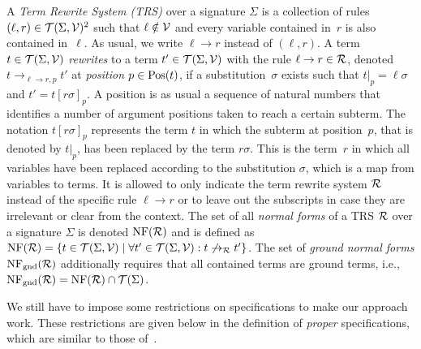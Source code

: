 \documentclass{eptcs}
\begin{document}
A \emph{Term Rewrite System (TRS)} over a signature $\Sigma$ is a collection of
rules $(\ell,r) \in \mathcal{T}(\Sigma,\mathcal{V})^2$ such that $\ell \notin \mathcal{V}$ and every
variable contained in~$r$ is also contained in~$\ell$. As usual, we write
$\ell \to r$ instead of $(\ell,r)$.
A term $t \in \mathcal{T}(\Sigma,\mathcal{V})$ \emph{rewrites} to a term $t' \in \mathcal{T}(\Sigma,\mathcal{V})$
with the rule $\ell \to r \in \mathcal{R}$, denoted $t \to_{\ell \to r,p} t'$
at \emph{position} $p \in \mathrm{Pos}(t)$, if a substitution~$\sigma$
exists such that $t|_p = \ell\sigma$ and $t' = t[r\sigma]_p$.
A position is as usual a sequence of natural numbers that identifies a number of
argument positions taken to reach a certain subterm. The notation $t[r\sigma]_p$
represents the term $t$ in which the subterm at position~$p$, that is denoted
by $t|_p$, has been replaced by the term $r\sigma$. This is the term~$r$ in
which all variables have been replaced according to the substitution $\sigma$,
which is a map from variables to terms.
It is allowed to only indicate the term rewrite system $\mathcal{R}$ instead of
the specific rule $\ell \to r$ or to leave out the subscripts in case they
are irrelevant or clear from the context.
The set of all \emph{normal forms} of a TRS $\mathcal{R}$ over a
signature $\Sigma$ is denoted $\mathrm{NF}(\mathcal{R})$ and is defined as $\mathrm{NF}(\mathcal{R}) =
\{ t \in \mathcal{T}(\Sigma,\mathcal{V}) \mid \forall t' \in \mathcal{T}(\Sigma,\mathcal{V}): t \not\to_{\mathcal{R}} t' \}$.
The set of \emph{ground normal forms} $\mathrm{NF}_{\mathrm{gnd}}(\mathcal{R})$ additionally requires
that all contained terms are ground terms, i.e.,
$\mathrm{NF}_{\mathrm{gnd}}(\mathcal{R}) = \mathrm{NF}(\mathcal{R}) \cap \mathcal{T}(\Sigma)$.


We still have to impose some restrictions on specifications to make our
approach work. These restrictions are given below in the definition of
\emph{proper} specifications, which are similar to those of~\cite{ZR10}.
\end{document}
